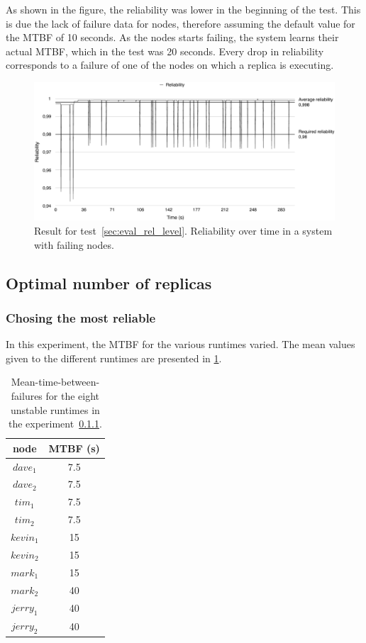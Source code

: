 \documentclass{cslthse-msc}
\begin{document}
As shown in the figure, the reliability was lower in the beginning of the test. This is due the lack of failure data for nodes, therefore assuming the default value for the MTBF of 10 seconds. As the nodes starts failing, the system learns their actual MTBF, which in the test was 20 seconds. Every drop in reliability corresponds to a failure of one of the nodes on which a replica is executing.

\begin{figure}[!hbt]
\centering
\includegraphics[scale=0.5]{images/results/reliability.pdf}
\caption{Result for test~\ref{sec:eval_rel_level}. Reliability over time in a system with failing nodes.} \label{fig:exp_reliability_level}
\end{figure}

\subsection{Optimal number of replicas}
\subsubsection{Chosing the most reliable} \label{sec:eval_opt_nbr_replicas}
In this experiment, the MTBF for the various runtimes varied. The mean values given to the different runtimes are presented in \cref{table:exp_nodes_means}. 

\begin{table}[h]
	\begin{center}
	\begin{tabular}{| c | c |}
	 \hline
	 node & MTBF (s) \\
	 \hline		
	  $dave_1$ & 7.5 \\
	  $dave_2$ & 7.5 \\
	  $tim_1$ & 7.5 \\
	  $tim_2$ & 7.5 \\
	  $kevin_1$ & 15 \\
	  $kevin_2$ & 15 \\
	  $mark_1$ & 15 \\
	  $mark_2$ & 40 \\
	  $jerry_1$ & 40 \\
	  $jerry_2$ & 40 \\
	   \hline
	\end{tabular}
	 \caption{Mean-time-between-failures for the eight unstable runtimes in the experiment~\ref{sec:eval_opt_nbr_replicas}.}
	 \label{table:exp_nodes_means}
	 \end{center}
 \end{table}
\end{document}

